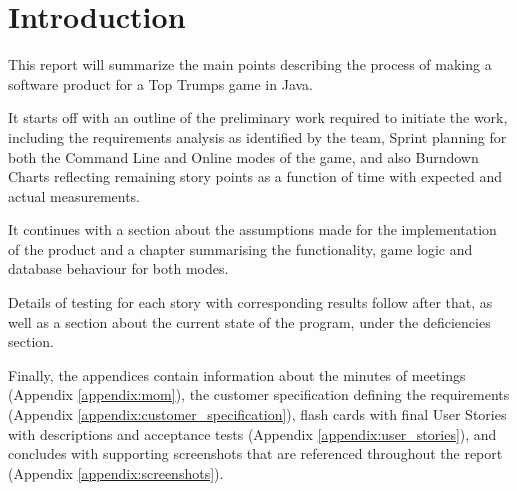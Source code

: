 \newpage
\section{Introduction}

This report will summarize the main points describing the process of making a software product for a Top Trumps game in Java.

It starts off with an outline of the preliminary work required to initiate the work, including the requirements analysis as identified by the team, Sprint planning for both the Command Line and Online modes of the game, and also Burndown Charts reflecting remaining story points as a function of time with expected and actual measurements.

It continues with a section about the assumptions made for the implementation of the product and a chapter summarising the functionality, game logic and database behaviour for both modes.

Details of testing for each story with corresponding results follow after that, as well as a section about the current state of the program, under the deficiencies section.

Finally, the appendices contain information about the minutes of meetings (Appendix \ref{appendix:mom}), the customer specification defining the requirements (Appendix \ref{appendix:customer_specification}), flash cards with final User Stories with descriptions and acceptance tests (Appendix \ref{appendix:user_stories}), and concludes with supporting screenshots that are referenced throughout the report (Appendix \ref{appendix:screenshots}).